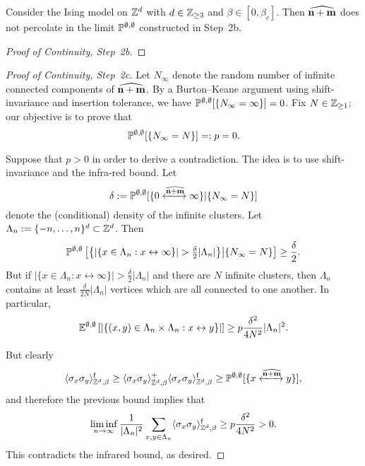 \begin{lemma}\label{lemma:continuity_step2c}
    Consider the Ising model on $\Z^d$ with $d\in\Z_{\geq 3}$
    and $\beta\in[0,\beta_c]$.
    Then $\widehat{\n+\m}$ does not percolate in the limit $\P^{\emptyset,\emptyset}$ constructed
    in Step~2b.
\end{lemma}

\begin{proof}[Proof of Continuity, Step~2b]
\end{proof}

\begin{proof}[Proof of Continuity, Step~2c]
    Let $N_\infty$ denote the random number of infinite connected components of $\widehat{\n+\m}$.
    By a Burton--Keane argument using shift-invariance and insertion tolerance,
    we have $\P^{\emptyset,\emptyset}[\{N_\infty=\infty\}]=0$.
    Fix $N\in\Z_{\geq 1}$; our objective is to prove that
    \[
        \P^{\emptyset,\emptyset}[\{N_\infty= N\}]=:p=0.
    \]

    Suppose that $p>0$ in order to derive a contradiction.
    The idea is to use shift-invariance and the infra-red bound.
    Let
    \[
        \delta:=\P^{\emptyset,\emptyset}[\{0\xleftrightarrow{\widehat{\n+\m}}\infty\}|\{N_\infty= N\}]
    \]
    denote the (conditional) density of the infinite clusters.
    Let $\Lambda_n:=\{-n,\dots,n\}^d\subset\Z^d$.
    Then
    \[
        \P^{\emptyset,\emptyset}\left[\left\{|\{x\in\Lambda_n:x\leftrightarrow\infty\}|>\tfrac{\delta}2|\Lambda_n|\right\}\middle|\{N_\infty= N\}\right]
        \geq
        \frac\delta2.
    \]
    But if $|\{x\in\Lambda_n:x\leftrightarrow\infty\}|>\tfrac{\delta}2|\Lambda_n|$
    and there are $N$ infinite clusters,
    then $\Lambda_n$ contains at least $\tfrac{\delta}{2N}|\Lambda_n|$
    vertices which are all connected to one another.
    In particular,
    \[
        \E^{\emptyset,\emptyset}\left[|\{(x,y)\in\Lambda_n\times\Lambda_n:x\leftrightarrow y\}|\right]
        \geq
        p
        \frac{\delta^2}{4N^2}|\Lambda_n|^2.
    \]

    But clearly
    \[
        \langle\sigma_x\sigma_y\rangle_{\Z^d,\beta}^\f
        \geq
        \langle\sigma_x\sigma_y\rangle_{\Z^d,\beta}^+
        \langle\sigma_x\sigma_y\rangle_{\Z^d,\beta}^\f
        \geq
        \P^{\emptyset,\emptyset}[\{x\xleftrightarrow{\widehat{\n+\m}}y\}],
    \]
    and therefore the previous bound implies that
    \[
        \liminf_{n\to\infty}\frac1{|\Lambda_n|^2}\sum_{x,y\in\Lambda_n}
        \langle\sigma_x\sigma_y\rangle_{\Z^d,\beta}^\f
        \geq p
        \frac{\delta^2}{4N^2}>0.
    \]
    This contradicts the infrared bound, as desired.
\end{proof}
